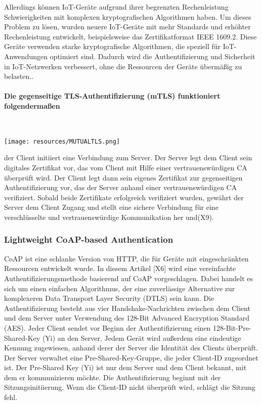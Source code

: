 Allerdings können IoT-Geräte aufgrund ihrer begrenzten Rechenleistung Schwierigkeiten mit komplexen kryptografischen Algorithmen haben.
Um dieses Problem zu lösen, wurden neuere IoT-Geräte mit mehr Standards und erhöhter Rechenleistung entwickelt, beispielsweise das Zertifikatformat IEEE 1609.2. Diese Geräte verwenden starke kryptografische Algorithmen, die speziell für IoT-Anwendungen optimiert sind. Dadurch wird die Authentifizierung und Sicherheit in IoT-Netzwerken verbessert, ohne die Ressourcen der Geräte übermäßig zu belasten.. \cite{khatoun2022cybersecurity}

\paragraph{Die gegenseitige TLS-Authentifizierung (mTLS) funktioniert folgendermaßen}
\

 \texttt{[image: resources/MUTUALTLS.png]}
 
 der Client initiiert eine Verbindung zum Server. Der Server legt dem Client sein digitales Zertifikat vor, das vom Client mit Hilfe einer vertrauenswürdigen CA überprüft wird. Der Client legt dann sein eigenes Zertifikat zur gegenseitigen Authentifizierung vor, das der Server anhand einer vertrauenswürdigen CA verifiziert. Sobald beide Zertifikate erfolgreich verifiziert wurden, gewährt der Server dem Client Zugang und stellt eine sichere Verbindung für eine verschlüsselte und vertrauenswürdige Kommunikation her \cite{khatoun2022cybersecurity} und(X9).

\subsubsection{Lightweight CoAP-based Authentication }

CoAP ist eine schlanke Version von HTTP, die für Geräte mit eingeschränkten Ressourcen entwickelt wurde. In diesem Artikel [X6] wird eine vereinfachte Authentifizierungsmethode basierend auf CoAP vorgeschlagen. Dabei handelt es sich um einen einfachen Algorithmus, der eine zuverlässige Alternative zur komplexeren Data Transport Layer Security (DTLS) sein kann. Die Authentifizierung besteht aus vier Handshake-Nachrichten zwischen dem Client und dem Server unter Verwendung des 128-Bit Advanced Encryption Standard (AES). Jeder Client sendet vor Beginn der Authentifizierung einen 128-Bit-Pre-Shared-Key (Yi) an den Server. Jedem Gerät wird außerdem eine eindeutige Kennung zugewiesen, anhand derer der Server die Identität des Clients überprüft. Der Server verwaltet eine Pre-Shared-Key-Gruppe, die jeder Client-ID zugeordnet ist. Der Pre-Shared Key (Yi) ist nur dem Server und dem Client bekannt, mit dem er kommunizieren möchte. Die Authentifizierung beginnt mit der Sitzungsinitiierung. Wenn die Client-ID nicht überprüft wird, schlägt die Sitzung fehl.

